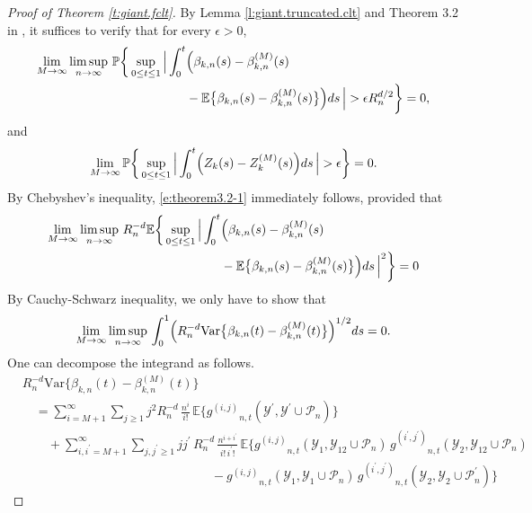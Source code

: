 \documentclass[11pt]{amsart}
\numberwithin{equation}{section}
\theoremstyle{plain}
\theoremstyle{definition}
\begin{document}
\begin{proof}[Proof of Theorem \ref{t:giant.fclt}]
By Lemma \ref{l:giant.truncated.clt} and Theorem 3.2 in \cite{billingsley:1999}, it suffices to verify that for every $\epsilon > 0$,
\begin{align}
\lim_{M\to\infty} \limsup_{n\to\infty}\, {\mathbb{P}} \biggl\{\, \sup_{0\leq t \leq 1}\, \Bigl| \, \int_0^t &\Bigl( \beta_{k,n}(s)-\beta_{k,n}^{(M)}(s) \label{e:theorem3.2-1}  \\
&- {\mathbb{E}} \bigl\{ \beta_{k,n}(s)-\beta_{k,n}^{(M)}(s) \bigr\} \Bigr)ds\, \Bigr| >\epsilon R_n^{d/2} \biggr\} = 0, \notag
\end{align}
and
\begin{equation} \label{e:theorem3.2-2}
\lim_{M\to\infty}{\mathbb{P}} \biggl\{\, \sup_{0\leq t \leq 1}\, \Bigl| \, \int_0^t \Bigl(Z_k(s) - Z_k^{(M)}(s)  \Bigr) ds\,  \Bigr| > \epsilon \biggr\} = 0.
\end{equation}
By Chebyshev's inequality, \eqref{e:theorem3.2-1} immediately follows, provided that
\begin{align*}
\lim_{M\to\infty} \limsup_{n\to\infty}\, R_n^{-d} {\mathbb{E}} \biggl\{\, \sup_{0\leq t \leq 1}\, \Bigl| \, \int_0^t &\Bigl( \beta_{k,n}(s)-\beta_{k,n}^{(M)}(s) \\
&- {\mathbb{E}} \bigl\{ \beta_{k,n}(s)-\beta_{k,n}^{(M)}(s) \bigr\} \Bigr)ds\, \Bigr|^2 \biggr\} = 0
\end{align*}
By Cauchy-Schwarz inequality, we only have to show that
$$
\lim_{M\to\infty} \limsup_{n\to\infty}\, \int_0^1 \Bigl( R_n^{-d} \text{Var} \bigl\{ \beta_{k,n}(t)- \beta_{k,n}^{(M)}(t) \bigr\} \Bigr)^{1/2} ds = 0.
$$
One can decompose the integrand as follows.
\begin{align*}
&R_n^{-d} \text{Var} \bigl\{ \beta_{k,n}(t)- \beta_{k,n}^{(M)}(t) \bigr\}  \\
&\quad = \sum_{i=M+1}^\infty \sum_{j\geq1} j^2 R_n^{-d}\, \frac{n^i}{i!}\, {\mathbb{E}} \bigl\{ {g^{(i,j)}}_{n,t}({{\mathcal{Y}^{\prime}}}, {{\mathcal{Y}^{\prime}}} \cup {\mathcal P_n}) \bigr\}  \\
&\qquad + \sum_{i,{i^{\prime}}=M+1}^\infty \sum_{j,{j^{\prime}} \geq1} j{j^{\prime}}\, R_n^{-d}\, \frac{n^{i+{i^{\prime}}}}{i!\,{i^{\prime}} !}\, {\mathbb{E}}\bigl\{ {g^{(i,j)}}_{n,t}({{\mathcal{Y}}}_1, {{\mathcal{Y}}}_{12} \cup {\mathcal P_n})\, {g^{(i^{\prime},j^{\prime})}}_{n,t}({{\mathcal{Y}}}_2,{{\mathcal{Y}}}_{12} \cup {\mathcal P_n}) \\
&\qquad \qquad \qquad \qquad \qquad \qquad \qquad \quad - {g^{(i,j)}}_{n,t}({{\mathcal{Y}}}_1, {{\mathcal{Y}}}_{1} \cup {\mathcal P_n})\, {g^{(i^{\prime},j^{\prime})}}_{n,t}({{\mathcal{Y}}}_2,{{\mathcal{Y}}}_{2} \cup {\mathcal P_n^{\prime}}) \bigr\}

\end{align*}
\end{proof}
\end{document}
